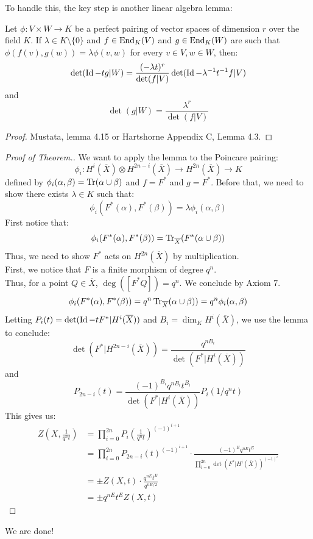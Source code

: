 \documentclass[12pt]{amsart}
\begin{document}
To handle this, the key step is another linear algebra lemma: 
\begin{lemma}
    Let $\phi: V \times W \to K$ be a perfect pairing of vector spaces of dimension $r$ over the field $K$. If $\lambda \in K \setminus \{0\}$ and $f \in \operatorname{End}_K(V)$ and $g \in \operatorname{End}_K(W)$ are such that $\phi(f(v), g(w)) = \lambda \phi(v, w)$ for every $v \in V, w \in W$, then:
    \[ \det(\operatorname{Id} - tg|W) = \frac{(-\lambda t)^r}{\det(f | V)} \det(\operatorname{Id} - \lambda^{-1}t^{-1}f|V)\]
    and 
    \[ \det(g | W) = \frac{\lambda^r}{\det(f|V)}\]
\end{lemma}
\begin{proof}
    Mustata, lemma 4.15 or Hartshorne Appendix C, Lemma 4.3.  
\end{proof}

\begin{proof}[Proof of Theorem.]
    We want to apply the lemma to the Poincare pairing: 
    \[\phi_i : H^i(\overline{X}) \otimes H^{2n-i}(\overline{X}) \to H^{2n}(\overline{X}) \to K\] 
    defined by $\phi_i(\alpha, \beta) = \operatorname{Tr}(\alpha \cup \beta)$ and $f = F^*$ and $g = F^*$. Before that, we need to show there exists $\lambda \in K$ such that:
    \[ \phi_i(F^*(\alpha), F^*(\beta)) = \lambda \phi_i(\alpha, \beta) \]
    First notice that:
    \[ \phi_i(F^*(\alpha), F^*(\beta)) = \operatorname{Tr}_{\overline{X}}(F^*(\alpha \cup \beta))\]
    Thus, we need to show $F^*$ acts on $H^{2n}(\overline{X})$ by multiplication. \\
    First, we notice that $F$ is a finite morphism of degree $q^n$. \\
    Thus, for a point $Q \in \overline{X}$, $\deg([F^*Q]) = q^n$. We conclude by Axiom 7.
    \[ \phi_i(F^*(\alpha), F^*(\beta)) = q^n\operatorname{Tr}_{\overline{X}}(\alpha \cup \beta)) = q^n \phi_i(\alpha, \beta)\]
    Letting $P_i(t) = \det(\operatorname{Id} -tF^*| H^i(\overline{X}))$ and $B_i = \dim_K H^i(\overline{X})$, we use the lemma to conclude: 
    \[ \det(F^* | H^{2n-i}(\overline X)) = \frac{q^{nB_i}}{\det(F^*|H^i(\overline X))} \]
    and 
    \[ P_{2n-i}(t) = \frac{(-1)^{B_i}q^{nB_i}t^{B_i}}{\det(F^*|H^i(\overline{X}))} P_i(1/q^nt)\]
    This gives us: 
    \begin{align*}
        Z\left(X, \frac{1}{q^nt}\right) &= \prod_{i=0}^{2n} P_i\left(\frac{1}{q^nt}\right)^{(-1)^{i+1}} \\ 
        &= \prod_{i=0}^{2n} P_{2n-i}(t)^{(-1)^{i+1}} \cdot \frac{(-1)^Eq^{nE}t^E}{\prod_{i=0}^{2n} \det(F^*|H^i(\overline{X}))^{(-1)^i}} \\
        &= \pm Z(X, t) \cdot \frac{q^{nE}t^E}{q^{nE/2}} \\
        &= \pm q^{nE}t^E Z(X,t)
    \end{align*}
\end{proof}

We are done! 
\end{document}
